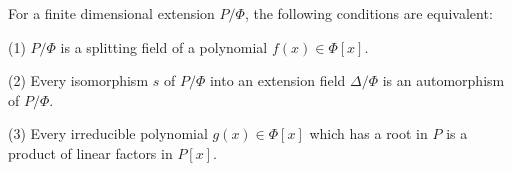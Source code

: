 For a finite dimensional extension $P/\Phi$, the following conditions are equivalent:

(1) $P/\Phi$ is a splitting field of a polynomial $f(x) \in \Phi[x]$.

(2) Every isomorphism $s$ of $P/\Phi$ into an extension field $\Delta/\Phi$ is an automorphism of $P/\Phi$.

(3) Every irreducible polynomial $g(x) \in \Phi[x]$ which has a root in $P$ is a product of linear factors in $P[x]$.
